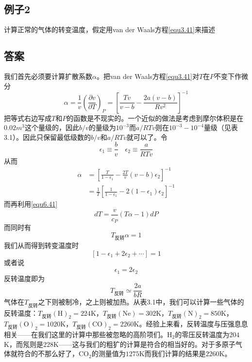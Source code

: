 \subsection*{例子2}
计算正常的气体的转变温度，假定用van der Waals方程\eqref{equ3.41}来描述
\subsection*{答案}
我们首先必须要计算扩散系数$\alpha$。把van der Waals方程\eqref{equ3.41}对$T$在$P$不变下作微分
\[\alpha = \frac{1}{v}\left(\frac{\partial v}{\partial T}\right)_P=\left[\frac{Tv}{v-b}-\frac{2a(v-b)}{Rv^2}\right]^{-1} \]
把等式右边写成$T$和$P$的函数是不现实的。一个近似的做法是考虑到摩尔体积是在$0.02m^3$这个量级的，因此$b/v$的量级为$10^{-3}$而$a/RTv$则在$10^{-3}-10^{-4}$量级（见表3.1）。因此只保留最低级数的$b/v$和$a/RTv$就可以了。令
\[\epsilon_1\equiv\frac{b}{v}\quad \epsilon_2\equiv\frac{a}{RTv} \]
从而
\[\begin{split}
\alpha&=\left[\frac{T}{1-\epsilon_1}-\frac{2T}{v}(v-b)\epsilon_2\right]^{-1}\\
&=\frac{1}{T}\left[\frac{1}{1-\epsilon_1}-2(1-\epsilon_1)\epsilon_2\right]^{-1}
\end{split} \]
而再利用\eqref{equ6.41}
\[dT=\frac{v}{c_P}(T\alpha-1)dP \]
而同时有
\[T_{\text{反转}}\alpha=1 \]
我们从而得到转变温度时
\[[1-\epsilon_1+2\epsilon_2+\cdots]=1 \]
或者说
\[\epsilon_1=2\epsilon_2 \]
反转温度即为
\[T_{\text{反转}}\simeq\frac{2a}{bR} \]
气体在$T_{\text{反转}}$之下则被制冷，之上则被加热。从表3.1中，我们可以计算一些气体的反转温度：$T_{\text{反转}}(\mathrm{H})_2=224$K，$T_{\text{反转}}(\mathrm{Ne})=302$K，$T_{\text{反转}}(\mathrm{N})_2=850$K，$T_{\text{反转}}(\mathrm{O})_2=1020$K，$T_{\text{反转}}(\mathrm{CO})_2=2260$K。经验上来看，反转温度与压强息息相关——在我们这里的计算中那些被忽略的高阶项们。H$_2$的零压反转温度为$204$K，而氖则是$228$K——这与我们的粗犷的计算是符合的相当好的。对于多原子气体就符合的不那么好了，CO$_2$的测量值为$1275$K而我们计算的结果是$2260$K。


